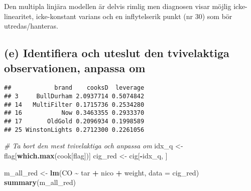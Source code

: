 \documentclass[
  11pt,
]{article}
\newenvironment{Shaded}{\begin{snugshade}}{\end{snugshade}}
\newcommand{\AttributeTok}[1]{\textcolor[rgb]{0.13,0.29,0.53}{#1}}
\newcommand{\CommentTok}[1]{\textcolor[rgb]{0.56,0.35,0.01}{\textit{#1}}}
\newcommand{\DecValTok}[1]{\textcolor[rgb]{0.00,0.00,0.81}{#1}}
\newcommand{\FunctionTok}[1]{\textcolor[rgb]{0.13,0.29,0.53}{\textbf{#1}}}
\newcommand{\NormalTok}[1]{#1}
\newcommand{\OtherTok}[1]{\textcolor[rgb]{0.56,0.35,0.01}{#1}}
\newcommand{\SpecialCharTok}[1]{\textcolor[rgb]{0.81,0.36,0.00}{\textbf{#1}}}
\begin{document}
Den multipla linjära modellen är delvis rimlig men diagnosen visar
möjlig icke-linearitet, icke-konstant varians och en inflytelserik punkt
(nr 30) som bör utredas/hanteras.

\subsection{(e) Identifiera och uteslut den tvivelaktiga observationen,
anpassa
om}\label{e-identifiera-och-uteslut-den-tvivelaktiga-observationen-anpassa-om}

\begin{Shaded}
\end{Shaded}

\begin{verbatim}
##            brand    cooksD  leverage
## 3     BullDurham 2.0937714 0.5074842
## 14   MultiFilter 0.1715736 0.2534280
## 16           Now 0.3463355 0.2933370
## 17       OldGold 0.2096934 0.1998589
## 25 WinstonLights 0.2712300 0.2261056
\end{verbatim}

\begin{Shaded}
\begin{Highlighting}[]
\CommentTok{\# Ta bort den mest tvivelaktiga och anpassa om}
\NormalTok{idx\_q }\OtherTok{\textless{}{-}}\NormalTok{ flag[}\FunctionTok{which.max}\NormalTok{(cook[flag])]}
\NormalTok{cig\_red }\OtherTok{\textless{}{-}}\NormalTok{ cig[}\SpecialCharTok{{-}}\NormalTok{idx\_q, ]}

\NormalTok{m\_all\_red }\OtherTok{\textless{}{-}} \FunctionTok{lm}\NormalTok{(CO }\SpecialCharTok{\textasciitilde{}}\NormalTok{ tar }\SpecialCharTok{+}\NormalTok{ nico }\SpecialCharTok{+}\NormalTok{ weight, }\AttributeTok{data =}\NormalTok{ cig\_red)}
\FunctionTok{summary}\NormalTok{(m\_all\_red)}
\end{Highlighting}
\end{Shaded}
\end{document}
